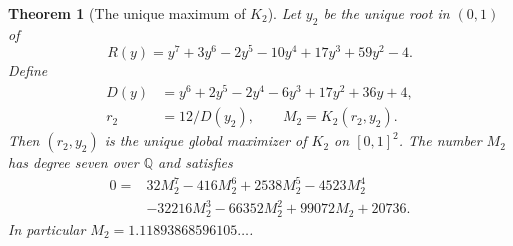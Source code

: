 \documentclass[11pt]{article}
\numberwithin{equation}{section}
\newtheorem{theorem}{Theorem}[section]
\theoremstyle{definition}
\theoremstyle{remark}
\begin{document}
\begin{theorem}[The unique maximum of $K_2$]\label{thm:M2}
Let $y_2$ be the unique root in $(0,1)$ of
\begin{equation}\label{eq:M2-R}
 R(y)=y^7+3y^6-2y^5-10y^4+17y^3+59y^2-4.
\end{equation}
Define
\begin{align}
 D(y)&=y^6+2y^5-2y^4-6y^3+17y^2+36y+4,
 \label{eq:M2-D}\\
 r_2&=12/D(y_2),\qquad M_2=K_2(r_2,y_2).
 \label{eq:M2-r}
\end{align}
Then $(r_2,y_2)$ is the unique global maximizer of $K_2$ on
$[0,1]^2$. The number $M_2$ has degree seven over $\mathbb Q$ and
satisfies
\begin{equation}\label{eq:M2-minpoly}
\begin{split}
 0={}&32M_2^7-416M_2^6+2538M_2^5-4523M_2^4\\
    &-32216M_2^3-66352M_2^2+99072M_2+20736.
\end{split}
\end{equation}
In particular $M_2=1.11893868596105\ldots$.
\end{theorem}
\end{document}
